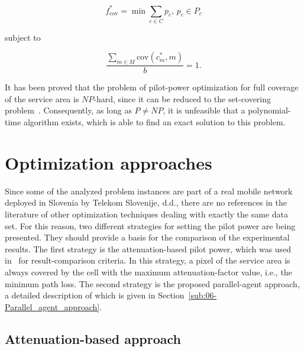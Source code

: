 \begin{equation}
f_{\mathrm{cov}}^{*}=\min\sum_{c\in C}p_{c},\, p_{c}\in P_{c}\label{eq:06-Objective_function}
\end{equation}


\noindent {}

\noindent subject to

\begin{equation}
\frac{\sum_{m\in M}\mathrm{cov}(c_{m}^{*},m)}{b}=1.\label{eq:06-Coverage_constraint}
\end{equation}


\bigskip{}


It has been proved that the problem of pilot-power optimization for
full coverage of the service area is $NP$-hard, since it can be reduced
to the set-covering problem~\cite{Varbrand_Mathematical.programming.approach:2003}.
Consequently, as long as $P\neq NP$, it is unfeasible that a polynomial-time
algorithm exists, which is able to find an exact solution to this
problem.


\section{Optimization approaches \label{sec:06-Optimization-approaches}}

Since some of the analyzed problem instances are part of a real mobile
network deployed in Slovenia by Telekom Slovenije, d.d., there are
no references in the literature of other optimization techniques dealing
with exactly the same data set. For this reason, two different strategies
for setting the pilot power are being presented. They should provide
a basis for the comparison of the experimental results. The first
strategy is the attenuation-based pilot power, which was used in~\cite{Siomina_Pilot.power.optimization:2004,Siomina:Minimum.pilot.power.for.service.coverage}
for result-comparison criteria. In this strategy, a pixel of the service
area is always covered by the cell with the maximum attenuation-factor
value, i.e., the minimum path loss. The second strategy is the proposed
parallel-agent approach, a detailed description of which is given
in Section~\ref{sub:06-Parallel_agent_approach}.


\subsection{Attenuation-based approach}


